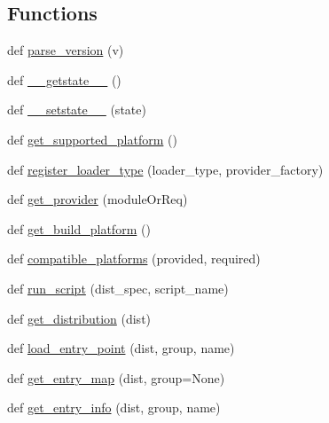 \subsection*{Functions}
\begin{DoxyCompactItemize}
\item 
def \hyperlink{namespacepip_1_1__vendor_1_1pkg__resources_a92bc2b76ba59a7f7e2c264890b280a65}{parse\+\_\+version} (v)
\item 
def \hyperlink{namespacepip_1_1__vendor_1_1pkg__resources_a4c70a72dcaf99f401d138ec049176056}{\+\_\+\+\_\+getstate\+\_\+\+\_\+} ()
\item 
def \hyperlink{namespacepip_1_1__vendor_1_1pkg__resources_a9c7db7bd62f73502d9bcae10ee143b3f}{\+\_\+\+\_\+setstate\+\_\+\+\_\+} (state)
\item 
def \hyperlink{namespacepip_1_1__vendor_1_1pkg__resources_a2727b5097b331e5359881914dc788fb7}{get\+\_\+supported\+\_\+platform} ()
\item 
def \hyperlink{namespacepip_1_1__vendor_1_1pkg__resources_ac15df9eeda704ffb4382ff13f2dfdc1a}{register\+\_\+loader\+\_\+type} (loader\+\_\+type, provider\+\_\+factory)
\item 
def \hyperlink{namespacepip_1_1__vendor_1_1pkg__resources_a677e93db6d072e044e0e907c17804b01}{get\+\_\+provider} (module\+Or\+Req)
\item 
def \hyperlink{namespacepip_1_1__vendor_1_1pkg__resources_ae7c894b8998697abd9ca6a173f5cbf83}{get\+\_\+build\+\_\+platform} ()
\item 
def \hyperlink{namespacepip_1_1__vendor_1_1pkg__resources_a472d6f1734f7c0deaf68c27b07f97704}{compatible\+\_\+platforms} (provided, required)
\item 
def \hyperlink{namespacepip_1_1__vendor_1_1pkg__resources_a96e7a55f46096d50d6783754f8922f2a}{run\+\_\+script} (dist\+\_\+spec, script\+\_\+name)
\item 
def \hyperlink{namespacepip_1_1__vendor_1_1pkg__resources_a66b83328f396096391076c94d6d4cf89}{get\+\_\+distribution} (dist)
\item 
def \hyperlink{namespacepip_1_1__vendor_1_1pkg__resources_a856488c57c641e3cafc340bc64d981c4}{load\+\_\+entry\+\_\+point} (dist, group, name)
\item 
def \hyperlink{namespacepip_1_1__vendor_1_1pkg__resources_acef1f5028e188ccc606596d430d09a08}{get\+\_\+entry\+\_\+map} (dist, group=None)
\item 
def \hyperlink{namespacepip_1_1__vendor_1_1pkg__resources_abf954cc52f4f05a1e1e424362061569b}{get\+\_\+entry\+\_\+info} (dist, group, name)

\end{DoxyCompactItemize}
